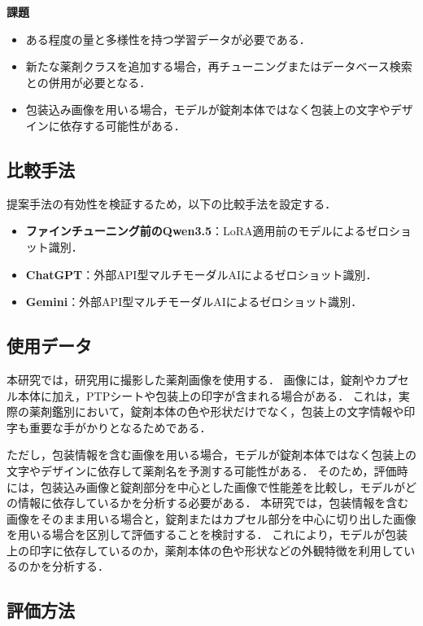 \documentclass{ltjsarticle}
\begin{document}
\textbf{課題}
\begin{itemize}
  \item ある程度の量と多様性を持つ学習データが必要である．
  \item 新たな薬剤クラスを追加する場合，再チューニングまたはデータベース検索との併用が必要となる．
  \item 包装込み画像を用いる場合，モデルが錠剤本体ではなく包装上の文字やデザインに依存する可能性がある．
\end{itemize}

\subsection{比較手法}

提案手法の有効性を検証するため，以下の比較手法を設定する．

\begin{itemize}
  \item \textbf{ファインチューニング前のQwen3.5}：LoRA適用前のモデルによるゼロショット識別．
  \item \textbf{ChatGPT}：外部API型マルチモーダルAIによるゼロショット識別．
  \item \textbf{Gemini}：外部API型マルチモーダルAIによるゼロショット識別．
\end{itemize}

\subsection{使用データ}

本研究では，研究用に撮影した薬剤画像を使用する．
画像には，錠剤やカプセル本体に加え，PTPシートや包装上の印字が含まれる場合がある．
これは，実際の薬剤鑑別において，錠剤本体の色や形状だけでなく，包装上の文字情報や印字も重要な手がかりとなるためである．

ただし，包装情報を含む画像を用いる場合，モデルが錠剤本体ではなく包装上の文字やデザインに依存して薬剤名を予測する可能性がある．
そのため，評価時には，包装込み画像と錠剤部分を中心とした画像で性能差を比較し，モデルがどの情報に依存しているかを分析する必要がある．
本研究では，包装情報を含む画像をそのまま用いる場合と，錠剤またはカプセル部分を中心に切り出した画像を用いる場合を区別して評価することを検討する．
これにより，モデルが包装上の印字に依存しているのか，薬剤本体の色や形状などの外観特徴を利用しているのかを分析する．

\subsection{評価方法}
\end{document}
